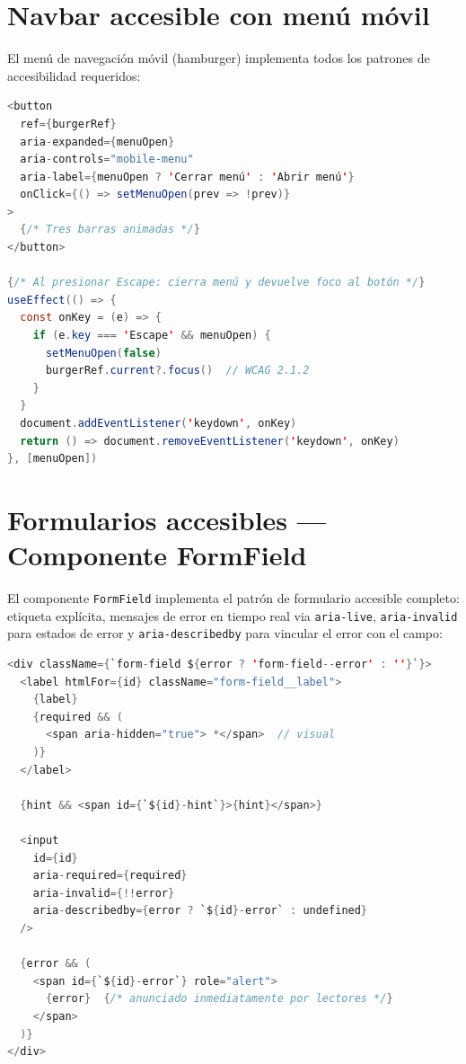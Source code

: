 \documentclass[12pt, a4paper]{report}
\begin{document}
\section{Navbar accesible con menú móvil}

El menú de navegación móvil (hamburger) implementa todos los patrones de accesibilidad requeridos:

\begin{lstlisting}[language=Java, caption={Navbar --- gestión de foco y atributos ARIA}, label={lst:navbar}]
<button
  ref={burgerRef}
  aria-expanded={menuOpen}
  aria-controls="mobile-menu"
  aria-label={menuOpen ? 'Cerrar menú' : 'Abrir menú'}
  onClick={() => setMenuOpen(prev => !prev)}
>
  {/* Tres barras animadas */}
</button>

{/* Al presionar Escape: cierra menú y devuelve foco al botón */}
useEffect(() => {
  const onKey = (e) => {
    if (e.key === 'Escape' && menuOpen) {
      setMenuOpen(false)
      burgerRef.current?.focus()  // WCAG 2.1.2
    }
  }
  document.addEventListener('keydown', onKey)
  return () => document.removeEventListener('keydown', onKey)
}, [menuOpen])
\end{lstlisting}

\section{Formularios accesibles --- Componente FormField}

El componente \texttt{FormField} implementa el patrón de formulario accesible completo: etiqueta explícita, mensajes de error en tiempo real via \texttt{aria-live}, \texttt{aria-invalid} para estados de error y \texttt{aria-describedby} para vincular el error con el campo:

\begin{lstlisting}[language=Java, caption={Estructura de FormField --- WCAG 3.3.1 y 3.3.2}, label={lst:formfield}]
<div className={`form-field ${error ? 'form-field--error' : ''}`}>
  <label htmlFor={id} className="form-field__label">
    {label}
    {required && (
      <span aria-hidden="true"> *</span>  // visual
    )}
  </label>

  {hint && <span id={`${id}-hint`}>{hint}</span>}

  <input
    id={id}
    aria-required={required}
    aria-invalid={!!error}
    aria-describedby={error ? `${id}-error` : undefined}
  />

  {error && (
    <span id={`${id}-error`} role="alert">
      {error}  {/* anunciado inmediatamente por lectores */}
    </span>
  )}
</div>
\end{lstlisting}
\end{document}
